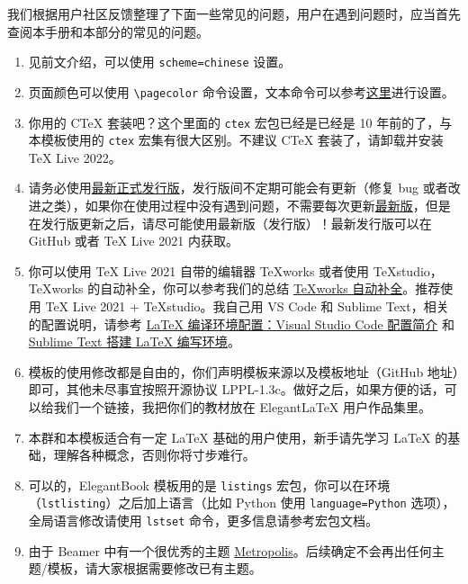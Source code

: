 \documentclass[lang=cn,newtx,10pt,scheme=chinese,color=black]{elegantbook}
\begin{document}
我们根据用户社区反馈整理了下面一些常见的问题，用户在遇到问题时，应当首先查阅本手册和本部分的常见的问题。

\begin{enumerate}[itemsep=1.5ex]
  \item {}
    见前文介绍，可以使用 \lstinline{scheme=chinese} 设置。
  \item {}
    页面颜色可以使用 \lstinline{\pagecolor} 命令设置，文本命令可以参考\href{https://tex.stackexchange.com/questions/278544/xcolor-what-is-the-equivalent-of-default-text-color}{这里}进行设置。
  \item {}
    你用的 C\TeX{} 套装吧？这个里面的 \lstinline{ctex} 宏包已经是已经是 10 年前的了，与本模板使用的 \lstinline{ctex} 宏集有很大区别。不建议 C\TeX{} 套装了，请卸载并安装 \TeX{} Live 2022。
  \item {}
    请务必使用\href{https://github.com/ElegantLaTeX/ElegantBook/releases}{最新正式发行版}，发行版间不定期可能会有更新（修复 bug 或者改进之类），如果你在使用过程中没有遇到问题，不需要每次更新\href{https://github.com/ElegantLaTeX/ElegantBook/archive/master.zip}{最新版}，但是在发行版更新之后，请尽可能使用最新版（发行版）！最新发行版可以在 GitHub 或者 \TeX{} Live 2021 内获取。
  \item {}
    你可以使用 \TeX{} Live 2021 自带的编辑器 \TeX{}works 或者使用 \TeX{}studio，\TeX works 的自动补全，你可以参考我们的总结 \href{https://github.com/EthanDeng/texworks-autocomplete}{\TeX works 自动补全}。推荐使用 \TeX{} Live 2021 + \TeX{}studio。我自己用 VS Code 和 Sublime Text，相关的配置说明，请参考 \href{https://github.com/EthanDeng/vscode-latex}{\LaTeX{} 编译环境配置：Visual Studio Code 配置简介} 和 \href{https://github.com/EthanDeng/sublime-text-latex}{Sublime Text 搭建 \LaTeX{} 编写环境}。
  \item {}
    模板的使用修改都是自由的，你们声明模板来源以及模板地址（GitHub 地址）即可，其他未尽事宜按照开源协议 LPPL-1.3c。做好之后，如果方便的话，可以给我们一个链接，我把你们的教材放在 Elegant\LaTeX{} 用户作品集里。
  \item {}
    本群和本模板适合有一定 \LaTeX{} 基础的用户使用，新手请先学习 \LaTeX{} 的基础，理解各种概念，否则你将寸步难行。
  \item {}
    可以的，ElegantBook 模板用的是 \lstinline{listings} 宏包，你可以在环境（\lstinline{lstlisting}）之后加上语言（比如 Python 使用 \lstinline{language=Python} 选项），全局语言修改请使用 \lstinline{lstset} 命令，更多信息请参考宏包文档。
  \item {}
    由于 Beamer 中有一个很优秀的主题 \href{https://github.com/matze/mtheme}{Metropolis}。后续确定不会再出任何主题/模板，请大家根据需要修改已有主题。
\end{enumerate}
\end{document}
